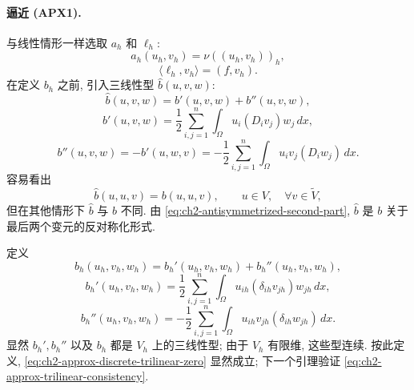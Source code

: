 \paragraph{逼近 (APX1).}
与线性情形一样选取 $a_h$ 和 $\ell_h$:
\begin{equation}
a_h(u_h,v_h)=\nu((u_h,v_h))_h,
\label{eq:ch2-apx1-bilinear-form}
\end{equation}
\begin{equation}
\langle\ell_h,v_h\rangle=(f,v_h).
\label{eq:ch2-apx1-load-form}
\end{equation}
在定义 $b_h$ 之前, 引入三线性型 $\widehat b(u,v,w)$:
\begin{equation}
\widehat b(u,v,w)=b'(u,v,w)+b''(u,v,w),
\label{eq:ch2-antisymmetrized-form}
\end{equation}
\begin{equation}
b'(u,v,w)=\frac12\sum_{i,j=1}^{n}\int_\Omega u_i(D_iv_j)w_j\,dx,
\label{eq:ch2-antisymmetrized-first-part}
\end{equation}
\begin{equation}
b''(u,v,w)=-b'(u,w,v)
=-\frac12\sum_{i,j=1}^{n}\int_\Omega u_iv_j(D_iw_j)\,dx.
\label{eq:ch2-antisymmetrized-second-part}
\end{equation}
容易看出
\begin{equation}
\widehat b(u,u,v)=b(u,u,v),
\qquad u\in V,\quad\forall v\in\widetilde V,
\label{eq:ch2-antisymmetrized-agrees-on-v}
\end{equation}
但在其他情形下 $\widehat b$ 与 $b$ 不同. 由 \eqref{eq:ch2-antisymmetrized-second-part}, $\widehat b$ 是 $b$ 关于最后两个变元的反对称化形式.

定义
\begin{equation}
b_h(u_h,v_h,w_h)=b_h'(u_h,v_h,w_h)+b_h''(u_h,v_h,w_h),
\label{eq:ch2-apx1-trilinear-form}
\end{equation}
\begin{equation}
b_h'(u_h,v_h,w_h)
=\frac12\sum_{i,j=1}^{n}\int_\Omega u_{ih}(\delta_{ih}v_{jh})w_{jh}\,dx,
\label{eq:ch2-apx1-trilinear-first-part}
\end{equation}
\begin{equation}
b_h''(u_h,v_h,w_h)
=-\frac12\sum_{i,j=1}^{n}\int_\Omega u_{ih}v_{jh}(\delta_{ih}w_{jh})\,dx.
\label{eq:ch2-apx1-trilinear-second-part}
\end{equation}
显然 $b_h',b_h''$ 以及 $b_h$ 都是 $V_h$ 上的三线性型; 由于 $V_h$ 有限维, 这些型连续. 按此定义, \eqref{eq:ch2-approx-discrete-trilinear-zero} 显然成立; 下一个引理验证 \eqref{eq:ch2-approx-trilinear-consistency}.

